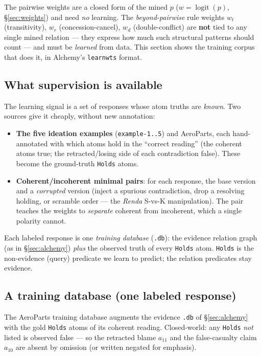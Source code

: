 \documentclass[11pt]{article}
\begin{document}
The pairwise weights are a closed form of the mined $p$ ($w=\operatorname{logit}(p)$,
\S\ref{sec:weights}) and need \emph{no} learning. The \emph{beyond-pairwise} rule weights
$w_t$ (transitivity), $w_r$ (concession-cancel), $w_d$ (double-conflict) are \textbf{not}
tied to any single mined relation --- they express how much such structural patterns should
count --- and must be \emph{learned} from data. This section shows the training corpus that
does it, in Alchemy's \texttt{learnwts} format.

\subsection{What supervision is available}
The learning signal is a set of responses whose atom truths are \emph{known}. Two sources
give it cheaply, without new annotation:
\begin{itemize}[leftmargin=*,nosep]
  \item \textbf{The five ideation examples} (\texttt{example-1..5}) and AeroParts, each
        hand-annotated with which atoms hold in the ``correct reading'' (the coherent atoms
        true; the retracted/losing side of each contradiction false). These become the
        ground-truth \texttt{Holds} atoms.
  \item \textbf{Coherent/incoherent minimal pairs}: for each response, the base version and a
        \emph{corrupted} version (inject a spurious contradiction, drop a resolving holding, or
        scramble order --- the \emph{Renda} S-vs-K manipulation). The pair teaches the weights
        to \emph{separate} coherent from incoherent, which a single polarity cannot.
\end{itemize}
Each labeled response is one \emph{training database} (\texttt{.db}): the evidence relation
graph (as in \S\ref{sec:alchemy}) \emph{plus} the observed truth of every \texttt{Holds}
atom. \texttt{Holds} is the non-evidence (query) predicate we learn to predict; the relation
predicates stay evidence.

\subsection{A training database (one labeled response)}
The AeroParts training database augments the evidence \texttt{.db} of \S\ref{sec:alchemy}
with the gold \texttt{Holds} atoms of its coherent reading. Closed-world: any \texttt{Holds}
\emph{not} listed is observed false --- so the retracted blame $a_{11}$ and the false-casualty
claim $a_{10}$ are absent by omission (or written negated for emphasis).
\end{document}
